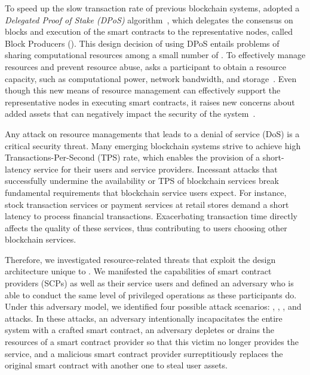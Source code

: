 To speed up the slow transaction rate of previous blockchain systems, \eos
adopted a \textit{Delegated Proof of Stake (DPoS)} algorithm~\cite{
larimer2014delegated}, which delegates the consensus on blocks and execution of
the smart contracts to the representative nodes, called Block Producers (\BPs).
This design decision of using DPoS entails problems of sharing computational
resources among a small number of \BPs. To effectively manage resources and
prevent resource abuse, \eos asks a participant to obtain a resource capacity,
such as computational power, network bandwidth, and storage~\cite{
EOSWHITEPAPER}.
%
Even though this new means of resource management can effectively support the
representative nodes in executing smart contracts, it raises new concerns about
added assets that can negatively impact the security of the
system~\cite{howard2006security}.


Any attack on resource managements that leads to a denial of service (DoS) is a
critical security threat. Many emerging blockchain systems strive to achieve 
high Transactions-Per-Second (TPS) rate, which enables the provision of a
short-latency service for their users and service providers. Incessant attacks
that successfully undermine the availability or TPS of blockchain services break
fundamental requirements that blockchain service users expect. For instance,
stock transaction services or payment services at retail stores demand a short
latency to process financial transactions. Exacerbating transaction time
directly affects the quality of these services, thus contributing to users
choosing other blockchain services.


Therefore, we investigated resource-related threats that exploit the design
architecture unique to \eos. We manifested the capabilities of smart contract
providers (SCPs) as well as their service users and defined an \eos adversary
who is able to conduct the same level of privileged operations as these
participants do. Under this adversary model, we identified four possible attack
scenarios: \NODEDOS, \TESER, \SCPDOS, and \TOCTOU attacks.
%
In these attacks, an adversary intentionally incapacitates the entire \eos system
with a crafted smart contract, an adversary depletes or drains the resources of
a smart contract provider so that this victim no longer provides the service,
and a malicious smart contract provider surreptitiously replaces the original smart
contract with another one to steal user assets.

